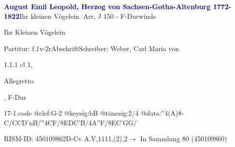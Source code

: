 \documentclass[a4paper, twocolumn, 11pt]{book}
\begin{document}
\par \vspace{16pt} \textcolor{darkblue}{\textbf{August Emil Leopold, Herzog von Sachsen-Gotha-Altenburg  1772-1822}}\hfillplus{[17]}\newline Ihr kleinen Vögelein. Arr, J 150 - F-Dur\newline winds
\par \begin{itshape} Ihr Kleinen Vögelein\end{itshape} 
\par \textcolor{darkblue}{}  Partitur: f.1v-2r\newline Abschrift\newline Schreiber: Weber, Carl Maria von
\par 1.1.1  cl 1, \begin{itshape}Allegretto\end{itshape}, F-Dur  
\begin{filecontents*}{17-1.code}
@clef:G-2
@keysig:bB
@timesig:2/4
@data:''4(A)8-C/{CCD'nB}/''4CF/{8EDC'B}/4A''F/{8EC'GG}/
\end{filecontents*}
\newline %
\par RISM-ID: 450109862\newline D-Cv  A.V,1111,(2),2\newline $\rightarrow$ In Sammlung 80 (450109860)
      
\end{document}
